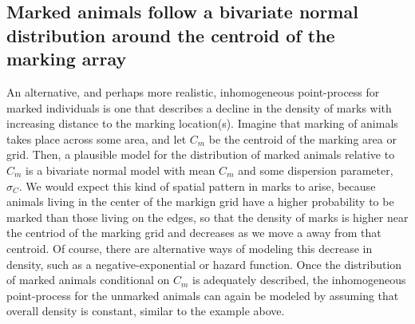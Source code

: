 \subsection{Marked animals follow a bivariate normal distribution around the centroid of the marking array}

An alternative, and perhaps more realistic, inhomogeneous
point-process for marked individuals is one that describes a decline
in the density of marks with increasing distance to the marking
location(s). Imagine that marking of animals takes place across some
area, and let $C_m$ be the centroid of the marking area or grid. Then,
a plausible model for the distribution of marked animals relative to
$C_m$ is a bivariate normal model with mean $C_m$ and some dispersion
parameter, $\sigma_C$. We would expect this kind of spatial pattern in
marks to arise, because animals living in the center of the markign
grid have a higher probability to be marked than those living on the
edges, so that the density of marks is higher near the centriod of the
marking grid and decreases as we move a away from that centroid. Of
course, there are alternative ways of modeling this decrease in
density, such as a negative-exponential or hazard function. Once the
distribution of marked animals conditional on $C_m$ is adequately
described, the inhomogeneous point-process for the unmarked animals
can again be modeled by assuming that overall density is constant,
similar to the example above.
 

